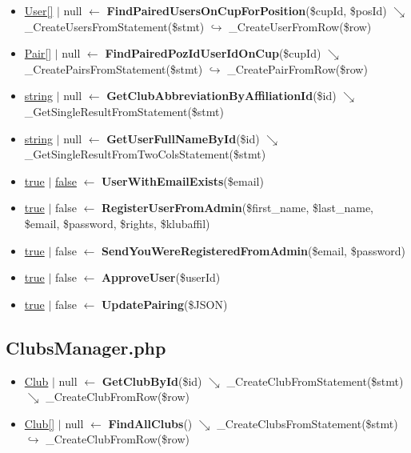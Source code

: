 \begin{itemize}
  \item \underline{User[]} $\vert$ null $\leftarrow$ \textbf{FindPairedUsersOnCupForPosition}(\$cupId, \$posId)
  \newline    $\searrow$ \_CreateUsersFromStatement(\$stmt)
  \newline    $\hookrightarrow$ \_CreateUserFromRow(\$row)
  \item \underline{Pair[]} $\vert$ null $\leftarrow$ \textbf{FindPairedPozIdUserIdOnCup}(\$cupId)
  \newline    $\searrow$ \_CreatePairsFromStatement(\$stmt)
  \newline    $\hookrightarrow$ \_CreatePairFromRow(\$row)
  \item \underline{string} $\vert$ null $\leftarrow$ \textbf{GetClubAbbreviationByAffiliationId}(\$id)
  \newline    $\searrow$ \_GetSingleResultFromStatement(\$stmt)
  \item \underline{string} $\vert$ null $\leftarrow$ \textbf{GetUserFullNameById}(\$id)
  \newline    $\searrow$ \_GetSingleResultFromTwoColsStatement(\$stmt)
  \item \underline{true} $\vert$ \underline{false} $\leftarrow$ \textbf{UserWithEmailExists}(\$email)
  \item \underline{true} $\vert$ false $\leftarrow$ \textbf{RegisterUserFromAdmin}(\$first\_name, \$last\_name,
  \newline    \$email, \$password, \$rights, \$klubaffil)
  \item \underline{true} $\vert$ false $\leftarrow$ \textbf{SendYouWereRegisteredFromAdmin}(\$email,
  \newline    \$password)
  \item \underline{true} $\vert$ false $\leftarrow$ \textbf{ApproveUser}(\$userId)
  \item \underline{true} $\vert$ false $\leftarrow$ \textbf{UpdatePairing}(\$JSON)
\end{itemize}
\subsection{ClubsManager.php}
\begin{itemize}
  \setlength\itemsep{0em}
  \item \underline{Club} $\vert$ null $\leftarrow$ \textbf{GetClubById}(\$id)
  \newline    $\searrow$ \_CreateClubFromStatement(\$stmt)
  \newline    $\searrow$ \_CreateClubFromRow(\$row)
  \item \underline{Club[]} $\vert$ null $\leftarrow$ \textbf{FindAllClubs}()
  \newline    $\searrow$ \_CreateClubsFromStatement(\$stmt)
  \newline    $\hookrightarrow$ \_CreateClubFromRow(\$row)
\end{itemize}
